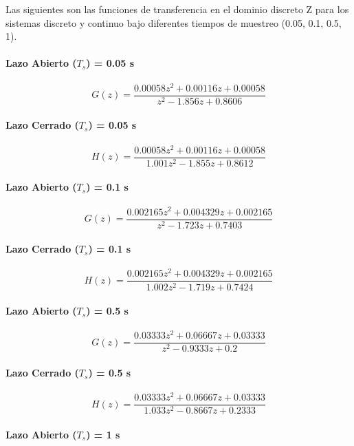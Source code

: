 \documentclass[journal]{IEEEtran}
\begin{document}
Las siguientes son las funciones de transferencia en el dominio discreto Z para los sistemas discreto y continuo bajo diferentes tiempos de muestreo (0.05, 0.1, 0.5, 1).


\paragraph{Lazo Abierto ($T_s$) = 0.05 s}

$$G(z) = \frac{0.00058 z^2 + 0.00116 z + 0.00058}{z^2 - 1.856 z + 0.8606}$$

\paragraph{Lazo Cerrado ($T_s$) = 0.05 s}

$$H(z) = \frac{0.00058 z^2 + 0.00116 z + 0.00058}{1.001 z^2 - 1.855 z + 0.8612}$$



\paragraph{Lazo Abierto ($T_s$) = 0.1 s}

$$G(z) = \frac{0.002165 z^2 + 0.004329 z + 0.002165}{z^2 - 1.723 z + 0.7403}$$

\paragraph{Lazo Cerrado ($T_s$) = 0.1 s}

$$H(z) = \frac{0.002165 z^2 + 0.004329 z + 0.002165}{1.002 z^2 - 1.719 z + 0.7424}$$


\paragraph{Lazo Abierto ($T_s$) = 0.5 s}

$$G(z) = \frac{0.03333 z^2 + 0.06667 z + 0.03333}{z^2 - 0.9333 z + 0.2}$$

\paragraph{Lazo Cerrado ($T_s$) = 0.5 s}

$$H(z) = \frac{0.03333 z^2 + 0.06667 z + 0.03333}{1.033 z^2 - 0.8667 z + 0.2333}$$



\paragraph{Lazo Abierto ($T_s$) = 1 s}
\end{document}
